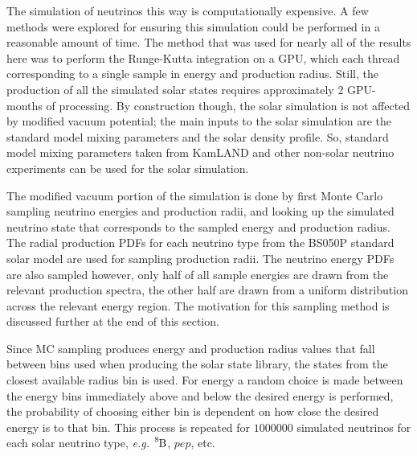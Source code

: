 The simulation of neutrinos this way is computationally expensive. A few methods
were explored for ensuring this simulation could be performed in a reasonable
amount of time. The method that was used for nearly all of the results here was
to perform the Runge-Kutta integration on a GPU, which each thread corresponding
to a single sample in energy and production radius.
Still, the production of all the simulated solar states requires approximately
2 GPU-months of processing.
By construction though, the solar simulation is not affected by modified
vacuum potential; the main inputs to the solar simulation are the standard model
mixing parameters and the solar density profile. So, standard model mixing parameters
taken from KamLAND and other non-solar neutrino experiments can be used for
the solar simulation.


The modified vacuum portion of the simulation is done by first Monte Carlo sampling
neutrino energies and production radii, and looking up the simulated
neutrino state that corresponds to the sampled energy and production radius.
The radial production PDFs for each neutrino type from the BS050P standard
solar model are used for sampling production radii.
The neutrino energy PDFs are also sampled
however, only half of all sample energies are drawn from the relevant production
spectra, the other half are drawn from a uniform distribution across the
relevant energy region.
The motivation for this sampling method is discussed further at the end of
this section.

Since MC sampling produces energy and production radius values that fall
between bins used when producing the solar state library, the states
from the closest available radius bin is used. For energy
a random choice is made between the energy bins immediately above and below
the desired energy is performed, the probability of choosing either bin
is dependent on how close the desired energy is to that bin.
This process is repeated for $1000000$ simulated neutrinos for each solar
neutrino type, \textit{e.g.} $\ce{^{8}B}$, $pep$, etc.


